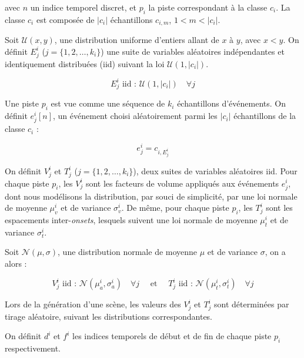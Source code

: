   avec $n$ un indice temporel discret, et $p_i$ la piste correspondant à la classe $c_i$. La classe $c_i$ est composée de $\vert c_i\vert$ échantillons $c_{i,m}$, $1<m<\vert c_i\vert$.

  Soit $\mathcal{U}(x,y)$, une distribution uniforme d'entiers allant de $x$ à $y$, avec $x<y$. On définit $E_j^i$ ($j=\lbrace 1,2,\ldots,k_i\rbrace$) une suite de variables aléatoires indépendantes et identiquement distribuées (iid) suivant la loi $\mathcal{U}(1,\vert c_i \vert)$.

  \begin{equation}
    E_j^i \textrm{ iid : } \mathcal{U}(1,\vert c_i \vert) \quad \forall j
  \end{equation}

  Une piste $p_i$ est vue comme une séquence de $k_i$ échantillons d'événements. On définit $e_j^i[n]$, un événement choisi aléatoirement parmi les $\vert c_i\vert$ échantillons de la classe $c_i$ :

  \begin{equation}
    e_j^i=c_{i,E_j^i}
  \end{equation}

  On définit $V^i_j$ et $T^i_j$ ($j=\lbrace 1,2,\ldots,k_i\rbrace$), deux suites de variables aléatoires iid. Pour chaque piste $p_i$, les $V^i_j$ sont les facteurs de volume appliqués aux événements $e_j^i$, dont nous modélisons la distribution, par souci de simplicité, par une loi normale de moyenne $\mu_v^i$ et de variance $\sigma_v^i$. De même, pour chaque piste $p_i$, les $T_j^i$ sont les espacements inter-\emph{onsets}, lesquels suivent une loi normale de moyenne $\mu_t^i$ et de variance $\sigma_t^i$.

  Soit $\mathcal{N}(\mu,\sigma)$, une distribution normale de moyenne $\mu$ et de variance $\sigma$, on a alors :

  \begin{equation}
    \label{eq:ch4_eq1}
    V_j^i \textrm{ iid : } \mathcal{N}(\mu_a^{i},\sigma_a^{i}) \quad \forall j \quad \textrm{ et } \quad T_j^i \textrm{ iid : } \mathcal{N}({\mu_t^{i},\sigma_t^{i}}) \quad \forall j
  \end{equation}

  Lors de la génération d'une scène, les valeurs des $V^i_j$ et $T_j^i$ sont déterminées par tirage aléatoire, suivant les distributions correspondantes.

  On définit $d^i$ et $f^i$ les indices temporels de début et de fin de chaque piste $p_i$ respectivement.

